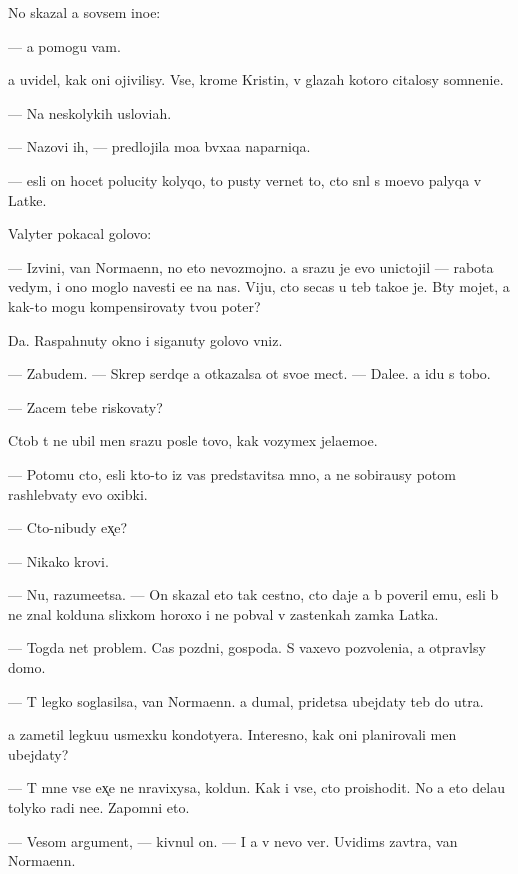 \documentclass[10pt]{book}
\begin{document}
No skazal {\y}a sovsem ino{\y}e:

— {\Y}a pomogu vam.

{\Y}a uvidel, kak oni ojivilisy. Vse, krome Kristin{\yi}, v glazah kotoro{\y} citalosy somneni{\y}e.

— Na neskolykih uslovi{\y}ah.

— Nazovi ih, — predlojila mo{\y}a b{\yi}vxa{\y}a naparniqa.

— {\Y}esli on hocet polucity kolyqo, to pusty vernet to, cto sn{\ia}l s mo{\y}evo palyqa v Latke.

Valyter pokacal golovo{\y}:

— Izvini, van Norma{\y}enn, no eto nevozmojno. {\Y}a srazu je {\y}evo unictojil — rabota vedym{\yi}, i ono moglo navesti {\y}e{\y}e na nas. Viju, cto se{\y}cas u teb{\ia} tako{\y}e je. B{\yi}ty mojet, {\y}a kak-to mogu kompensirovaty tvo{\y}u poter{\iu}?

Da. Raspahnuty okno i siganuty golovo{\y} vniz.

— Zabudem. — Skrep{\ia} serdqe {\y}a otkazalsa ot svo{\y}e{\y} mect{\yi}. — Dale{\y}e. {\Y}a idu s tobo{\y}.

— Zacem tebe riskovaty?

Ctob{\yi} t{\yi} ne ubil men{\ia} srazu posle tovo, kak vozymex jela{\y}emo{\y}e.

— Potomu cto, {\y}esli kto-to iz vas predstavitsa mno{\y}, {\y}a ne sobira{\y}usy potom rashleb{\yi}vaty {\y}evo oxibki.

— Cto-nibudy {\y}ex̨e?

— Nikako{\y} krovi.

— Nu, razume{\y}etsa. — On skazal eto tak cestno, cto daje {\y}a b{\yi} poveril {\y}emu, {\y}esli b{\yi} ne znal kolduna slixkom horoxo i ne pob{\yi}val v zastenkah zamka Latka.

— Togda net problem. Cas pozdni{\y}, gospoda. S vaxevo pozvoleni{\y}a, {\y}a otpravl{\iu}sy domo{\y}.

— T{\yi} legko soglasilsa, van Norma{\y}enn. {\Y}a dumal, pridetsa ubejdaty teb{\ia} do utra.

{\Y}a zametil legku{\y}u usmexku kondotyera. Interesno, kak oni planirovali men{\ia} ubejdaty?

— T{\yi} mne vse {\y}ex̨e ne nravixysa, koldun. Kak i vse, cto pro{\y}ishodit. No {\y}a eto dela{\y}u tolyko radi ne{\y}e. Zapomni eto.

— Vesom{\yi}{\y} argument, — kivnul on. — I {\y}a v nevo ver{\iu}. Uvidims{\ia} zavtra, van Norma{\y}enn.
\end{document}
